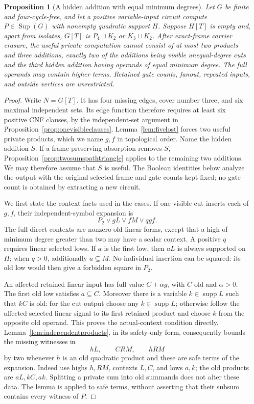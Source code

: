 \documentclass[11pt]{article}
\newcommand{\supp}{\operatorname{supp}}
\newcommand{\Sup}{\operatorname{Sup}}
\newtheorem{proposition}[theorem]{Proposition}
\theoremstyle{definition}
\theoremstyle{remark}
\begin{document}
\begin{proposition}[A hidden addition with equal minimum degrees]\label{prop:hiddenhomogeneous}
Let $G$ be finite and four-cycle-free, and let a positive variable-input circuit compute $P\in\Sup(G)$ with nonempty quadratic support $H$. Suppose $H[T]$ is empty and, apart from isolates, $G[T]$ is $P_4\sqcup K_2$ or $K_3\sqcup K_2$. After exact-frame carrier erasure, the useful private computation cannot consist of at most two products and three additions, exactly two of the additions being visible unequal-degree cuts and the third hidden addition having operands of equal minimum degree. The full operands may contain higher terms. Retained gate counts, fanout, repeated inputs, and outside vertices are unrestricted.
\end{proposition}
\begin{proof}
Write $N=G[T]$. It has four missing edges, cover number three, and six maximal independent sets. Its edge function therefore requires at least six positive CNF clauses, by the independent-set argument in Proposition~\ref{prop:onevisibleclauses}. Lemma~\ref{lem:fivelost} forces two useful private products, which we name $g,f$ in topological order. Name the hidden addition $S$. If a frame-preserving absorption removes $S$, Proposition~\ref{prop:twosumspathtriangle} applies to the remaining two additions. We may therefore assume that $S$ is useful. The Boolean identities below analyze the output with the original selected frame and gate counts kept fixed; no gate count is obtained by extracting a new circuit.

We first state the context facts used in the cases. If one visible cut inserts each of $g,f$, their independent-symbol expansion is
\[
 P_2\vee gL\vee fM\vee qgf.                         \tag{*}
\]
The full direct contexts are nonzero old linear forms, except that a high of minimum degree greater than two may have a scalar context. A positive $q$ requires linear selected lows. If $a$ is the first low, then $aL$ is always supported on $H$; when $q>0$, additionally $a\subseteq M$. No individual insertion can be squared: its old low would then give a forbidden square in $P_2$.

An affected retained linear input has full value $C+\alpha g$, with $C$ old and $\alpha>0$. The first old low satisfies $a\subseteq C$. Moreover there is a variable $k\in\supp L$ such that $kC$ is old: for the cut output choose any $k\in\supp L$; otherwise follow the affected selected linear signal to its first retained product and choose $k$ from the opposite old operand. This proves the actual-context condition directly. Lemma~\ref{lem:independentproducts}, in its safety-only form, consequently bounds the missing witnesses in
\[
 hL,\qquad CRM,\qquad hRM                            \tag{**}
\]
by two whenever $h$ is an old quadratic product and these are safe terms of the expansion. Indeed use highs $h,RM$, contexts $L,C$, and lows $a,k$; the old products are $aL,kC,ak$. Splitting a private sum into old summands does not alter these data. The lemma is applied to safe terms, without asserting that their subsum contains every witness of $P$.


\end{proof}
\end{document}
